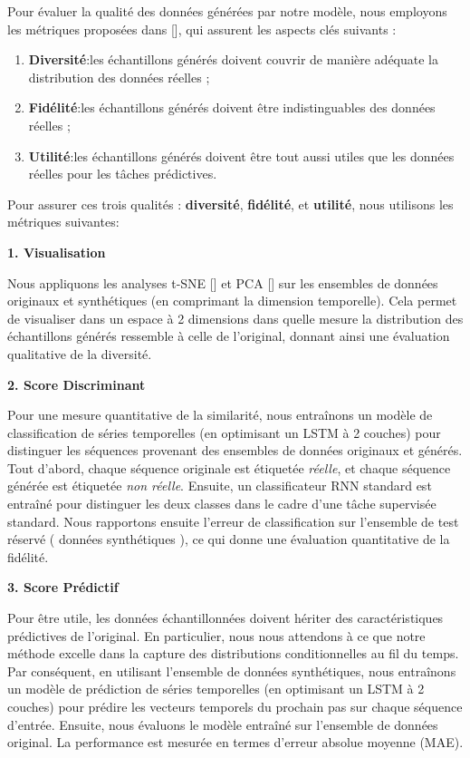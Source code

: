 Pour évaluer la qualité des données générées par notre modèle, nous employons
les métriques proposées dans [\cite{yoon2019time}], qui assurent les aspects
clés suivants :
\begin{enumerate}
  \item \textbf{Diversité}:les échantillons générés doivent couvrir de manière adéquate la distribution des données réelles ;
  \item \textbf{Fidélité}:les échantillons générés doivent être indistinguables des données réelles ;
  \item \textbf{Utilité}:les échantillons générés doivent être tout aussi utiles que les données réelles pour les tâches prédictives.
\end{enumerate}

Pour assurer ces trois qualités : \textbf{diversité}, \textbf{fidélité}, et
\textbf{utilité}, nous utilisons les métriques suivantes:

\textbf{1. Visualisation}

Nous appliquons les analyses t-SNE [\cite{van2008visualizing}] et PCA
  [\cite{wold1987principal}] sur les ensembles de données originaux et
synthétiques (en comprimant la dimension temporelle). Cela permet de visualiser
dans un espace à 2 dimensions dans quelle mesure la distribution des
échantillons générés ressemble à celle de l'original, donnant ainsi une
évaluation qualitative de la diversité.

\textbf{2. Score Discriminant}

Pour une mesure quantitative de la similarité, nous entraînons un modèle de
classification de séries temporelles (en optimisant un LSTM à 2 couches) pour
distinguer les séquences provenant des ensembles de données originaux et
générés. Tout d'abord, chaque séquence originale est étiquetée \textit{réelle},
et chaque séquence générée est étiquetée \textit{non réelle}. Ensuite, un
classificateur RNN standard est entraîné pour distinguer les deux classes dans
le cadre d'une tâche supervisée standard. Nous rapportons ensuite l'erreur de
classification sur l'ensemble de test réservé ( données synthétiques ), ce qui
donne une évaluation quantitative de la fidélité.

\textbf{3. Score Prédictif}

Pour être utile, les données échantillonnées doivent hériter des
caractéristiques prédictives de l'original. En particulier, nous nous attendons
à ce que notre méthode excelle dans la capture des distributions
conditionnelles au fil du temps. Par conséquent, en utilisant l'ensemble de
données synthétiques, nous entraînons un modèle de prédiction de séries
temporelles (en optimisant un LSTM à 2 couches) pour prédire les vecteurs
temporels du prochain pas sur chaque séquence d'entrée. Ensuite, nous évaluons
le modèle entraîné sur l'ensemble de données original. La performance est
mesurée en termes d'erreur absolue moyenne (MAE).

